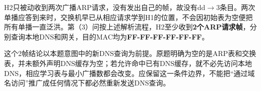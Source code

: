 \documentclass{sidenotes-simplex}
\begin{document}
H2只被动收到两次广播ARP请求，没有发出自己的帧，故没有dd\ensuremath{\to}3条目。两次单播应答到来时，交换机早已从相应请求学到H1的位置，不会因初始表为空便把所有单播一直泛洪。第（3）问按上述解析流程，H2至少收到\textbf{2个ARP请求帧}，分别查询本地DNS和网关，目的MAC均为\textbf{FF-FF-FF-FF-FF-FF}。

这个2帧结论以本题意图中的新DNS查询为前提。原题明确为空的是ARP表和交换表，并未额外声明DNS缓存为空；若允许命中已有DNS缓存，就不必先访问本地DNS，相应学习表与最小广播数都会改变。应保留这一条件边界，不能把``通过域名访问''推广成任何情况下都必然重新发送DNS查询。
\end{document}
